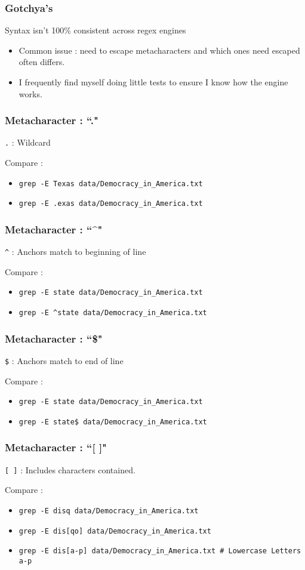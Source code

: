 \documentclass{beamer}
\newcommand{\code}[1]{\colorbox{codegray}{\texttt{#1}}}
\begin{document}
\begin{frame}
\frametitle{Gotchya's}
Syntax isn't 100\% consistent across regex engines
\pause
\begin{itemize}
    \item Common issue : need to escape metacharacters and which ones need escaped often differs.
    \pause
    \item I frequently find myself doing little tests to ensure I know how the engine works.
\end{itemize}
\end{frame}

\begin{frame}
\frametitle{Metacharacter : ``."}
\code{.} : Wildcard

\bigskip

Compare :
\begin{itemize}
    \item \code{grep -E Texas data/Democracy\_in\_America.txt}
    \pause
    \item \code{grep -E .exas data/Democracy\_in\_America.txt}
\end{itemize}
\end{frame}


\begin{frame}
\frametitle{Metacharacter : ``\^{}"}
\code{\^{}} : Anchors match to beginning of line
\bigskip

Compare :
\begin{itemize}
    \item \code{grep -E state data/Democracy\_in\_America.txt}
    \pause
    \item \code{grep -E \^{}state data/Democracy\_in\_America.txt}
\end{itemize}
\end{frame}

\begin{frame}
\frametitle{Metacharacter : ``\$"}
\code{\$} : Anchors match to end of line
\bigskip

Compare :
\begin{itemize}
    \item \code{grep -E state data/Democracy\_in\_America.txt}
    \pause
    \item \code{grep -E state\$ data/Democracy\_in\_America.txt}
\end{itemize}
\end{frame}

\begin{frame}
\frametitle{Metacharacter : ``[ ]"}
\code{[ ]} : Includes characters contained. 
\bigskip

Compare :
\begin{itemize}
    \item \code{grep -E disq data/Democracy\_in\_America.txt}
    \pause
    \item \code{grep -E dis[qo] data/Democracy\_in\_America.txt}
    \pause
    \item \code{grep -E dis[a-p] data/Democracy\_in\_America.txt \# Lowercase Letters a-p}   
\end{itemize}
\end{frame}
\end{document}
